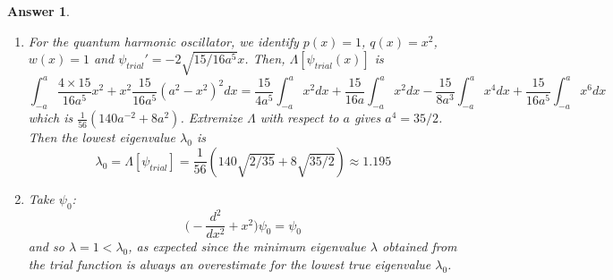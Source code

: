 \documentclass[a4paper]{article}
\newtheorem{ans}{Answer}[section]
\theoremstyle{new}
\begin{document}
\begin{ans}
\begin{enumerate}[label=(\roman*)]
\begin{enumerate}[label=(\alph*)]
\item For the quantum harmonic oscillator, we identify $p(x)=1$, $q(x)=x^2$, $w(x)=1$ and $\psi_{trial}'=-2\sqrt{15/16a^5}x$. Then, $\Lambda[\psi_{trial}(x)]$ is
$$\int_{-a}^a\frac{4\times 15}{16a^5}x^2+x^2\frac{15}{16a^5}(a^2-x^2)^2dx=\frac{15}{4a^5}\int_{-a}^ax^2dx+\frac{15}{16a}\int_{-a}^ax^2dx-\frac{15}{8a^3}\int_{-a}^ax^4dx+\frac{15}{16a^5}\int_{-a}^ax^6dx$$
which is $\frac{1}{56}(140 a^{-2}+8a^2)$. Extremize $\Lambda$ with respect to $a$ gives $a^4=35/2$. Then the lowest eigenvalue $\lambda_0$ is
$$\lambda_0=\Lambda[\psi_{trial}]=\frac{1}{56}(140\sqrt{2/35}+8\sqrt{35/2})\approx 1.195$$
\item Take $\psi_0$:
$$\bigg(-\frac{d^2}{dx^2}+x^2\bigg)\psi_0=\psi_0$$
and so $\lambda=1<\lambda_0$, as expected since the minimum eigenvalue $\lambda$ obtained from the trial function is always an overestimate for the lowest true eigenvalue $\lambda_0$.
\end{enumerate}
\end{enumerate}
\end{ans}
\newpage
\end{document}
